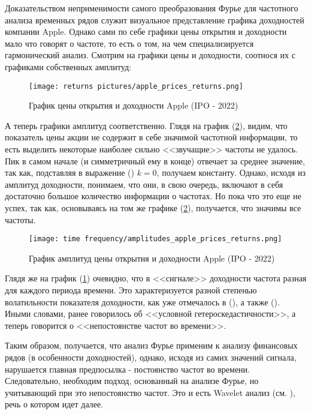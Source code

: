 Доказательством неприменимости самого преобразования Фурье для частотного анализа временных рядов служит визуальное представление графика доходностей компании Apple. Однако сами по себе графики цены открытия и доходности мало что говорят о частоте, то есть о том, на чем специализируется гармонический анализ. Смотрим на графики цены и доходности, соотнося их с графиками собственных амплитуд:
\begin{figure}[H]
	\centering
	\texttt{[image: returns pictures/apple\_prices\_returns.png]}
	\caption{График цены открытия и доходности Apple (IPO - 2022)}
	\label{fig::apple_prices_returns}
\end{figure}
\noindent А теперь графики амплитуд соответственно. Глядя на график (\ref{fig::amplitudes_apple_prices_returns}), видим, что показатель цены акции не содержит в себе значимой частотной информации, то есть выделить некоторые наиболее сильно <<звучащие>> частоты не удалось. Пик в самом начале (и симметричный ему в конце) отвечает за среднее значение, так как, подставляя в выражение () $k = 0$, получаем константу. Однако, исходя из амплитуд доходности, понимаем, что они, в свою очередь, включают в себя достаточно большое количество информации о частотах. Но пока что это еще не успех, так как, основываясь на том же графике (\ref{fig::amplitudes_apple_prices_returns}), получается, что значимы все частоты. 
\begin{figure}[H]
	\centering
	\texttt{[image: time frequency/amplitudes\_apple\_prices\_returns.png]}
	\caption{График амплитуд цены открытия и доходности Apple (IPO - 2022)}
	\label{fig::amplitudes_apple_prices_returns}
\end{figure}
Глядя же на график (\ref{fig::apple_prices_returns}) очевидно, что в <<сигнале>> доходности частота разная для каждого периода времени. Это характеризуется разной степенью волатильности показателя доходности, как уже отмечалось в (), а также (). Иными словами, ранее говорилось об <<условной гетероскедастичности>>, а теперь говорится о <<непостоянстве частот во времени>>.

Таким образом, получается, что анализ Фурье применим к анализу финансовых рядов (в особенности доходностей), однако, исходя из самих значений сигнала, нарушается главная предпосылка - постоянство частот во времени. Следовательно, необходим подход, основанный на анализе Фурье, но учитывающий при это непостоянство частот. Это и есть Wavelet анализ (см. ), речь о котором идет далее.